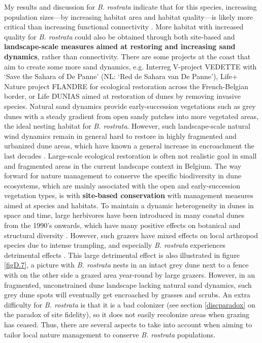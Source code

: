 \documentclass[10pt, twoside]{book} %
\begin{document}
	My results and discussion for \textit{B. rostrata} indicate that for this species, increasing population sizes---by increasing habitat area and habitat quality---is likely more critical than increasing functional connectivity \citep{richardson2016, watts2016}. More habitat with increased quality for \textit{B. rostrata} could also be obtained through both site-based and \textbf{landscape-scale measures aimed at restoring and increasing sand dynamics}, rather than connectivity. There are some projects at the coast that aim to create some more sand dynamics, e.g. Interreg V-project VEDETTE with `Save the Sahara of De Panne' (NL: `Red de Sahara van De Panne'), Life+ Nature project FLANDRE for ecological restoration across the French-Belgian border, or Life DUNIAS aimed at restoration of dunes by removing invasive species. Natural sand dynamics provide early-succession vegetations such as grey dunes with a steady gradient from open sandy patches into more vegetated areas, the ideal nesting habitat for \textit{B. rostrata}. However, such landscape-scale natural wind dynamics remain in general hard to restore in highly fragmented and urbanized dune areas, which have known a general increase in encroachment the last decades \citep{provoost2011, provoost2020}. Large-scale ecological restoration is often not realistic goal in small and fragmented areas in the current landscape context in Belgium. The way forward for nature management to conserve the specific biodiversity in dune ecosystems, which are mainly associated with the open and early-succession vegetation types, is with \textbf{site-based conservation} with management measures aimed at species and habitats. To maintain a dynamic heterogeneity in dunes in space and time, large herbivores have been introduced in many coastal dunes from the 1990's onwards, which have many positive effects on botanical and structural diversity \citep{provoost2004}. However, such grazers have mixed effects on local arthropod species due to intense trampling, and especially \textit{B. rostrata} experiences detrimental effects \citep{bonte2005, maes2006, bonte2008, vanklink2015}. This large detrimental effect is also illustrated in figure \ref{figD.7}, a picture with \textit{B. rostrata} nests in an intact grey dune next to a fence with on the other side a grazed area year-round by large grazers. However, in an fragmented, unconstrained dune landscape lacking natural sand dynamics, such grey dune spots will eventually get encroached by grasses and scrubs. An extra difficulty for \textit{B. rostrata} is that it is a bad colonizer (see section \ref{discparadox} on the paradox of site fidelity), so it does not easily recolonize areas when grazing has ceased. Thus, there are several aspects to take into account when aiming to tailor local nature management to conserve \textit{B. rostrata} populations.\\
	
\end{document}
